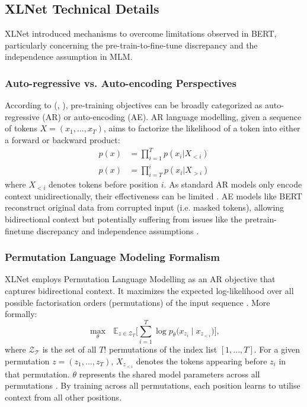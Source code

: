 \documentclass[10pt,oneside]{report}
\renewcommand{\citet}[1]{\citeauthor{#1}, \citeyear{#1}}
\begin{document}
\subsection{XLNet Technical Details}\label{app:xlnet_maths}

XLNet \cite{yang2019xlnet} introduced mechanisms to overcome limitations observed in BERT, particularly concerning the pre-train-to-fine-tune discrepancy and the independence assumption in MLM.

\subsubsection*{Auto-regressive vs. Auto-encoding Perspectives}
According to (\citet{yang2019xlnet}), pre-training objectives can be broadly categorized as auto-regressive (AR) or auto-encoding (AE). AR language modelling, given a sequence of tokens $X = (x_1, ..., x_T)$, aims to factorize the likelihood of a token into either a forward or backward product:
\begin{align}
    p(x) &= \prod_{i=1}^{T} p(x_i | X_{<i}) \label{eq:fwdprod_appendix} \\
    p(x) &= \prod_{i=T}^{i} p(x_i | X_{>i}) \label{eq:bckprod_appendix}
\end{align}
where $X_{<i}$ denotes tokens before position $i$. As standard AR models only encode context unidirectionally, their effectiveness can be limited \cite{yang2019xlnet}. AE models like BERT reconstruct original data from corrupted input (i.e. masked tokens), allowing bidirectional context but potentially suffering from issues like the pretrain-finetune discrepancy and independence assumptions \cite{yang2019xlnet}.

\subsubsection*{Permutation Language Modeling Formalism}
XLNet employs Permutation Language Modelling as an AR objective that captures bidirectional context. It maximizes the expected log-likelihood over all possible factorisation orders (permutations) of the input sequence \cite{yang2019xlnet}. More formally:
\begin{equation}
    \max_{\theta} \text{  } \mathbb{E}_{z\in\mathcal{Z}_T} \bigl[ \sum_{i=1}^{T} \log p_{\theta} \bigl(x_{z_i}\mid x_{z_{<i}}\bigr) \bigr], \label{eq:plm_appendix} %
\end{equation}
where $\mathcal{Z_T}$ is the set of all $T!$ permutations of the index list $[1, ... , T]$. For a given permutation $z = (z_1, ..., z_T)$, $X_{z_{<i}}$ denotes the tokens appearing before $z_i$ in that permutation. $\theta$ represents the shared model parameters across all permutations \cite{yang2019xlnet}. By training across all permutations, each position learns to utilise context from all other positions.
\end{document}

